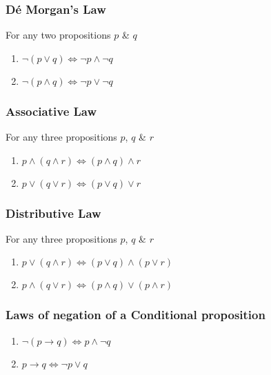 \documentclass{article}
\begin{document}
	\subsubsection{D\'{e} Morgan's Law}
	For any two propositions $p$ \& $q$
	\begin{enumerate}[label=\roman*)]
		\item $\neg(p\lor q)\Leftrightarrow\neg p\land\neg q$
		\item $\neg(p\land q)\Leftrightarrow\neg p\lor\neg q$
	\end{enumerate}

	\subsubsection{Associative Law}
	For any three propositions $p$, $q$ \& $r$
	\begin{enumerate}[label=\roman*)]
		\item $p\land(q\land r)\Leftrightarrow (p\land q)\land r$
		\item $p\lor(q\lor r)\Leftrightarrow (p\lor q)\lor r$
	\end{enumerate}

	\subsubsection{Distributive Law}
	For any three propositions $p$, $q$ \& $r$
	\begin{enumerate}[label=\roman*)]
		\item $p\lor(q\land r)\Leftrightarrow (p\lor q)\land(p\lor r)$
		\item $p\land(q\lor r)\Leftrightarrow (p\land q)\lor(p\land r)$
	\end{enumerate}

	\subsubsection{Laws of negation of a Conditional proposition}
	\begin{enumerate}[label=\roman*)]
		\item $\neg(p\to q)\Leftrightarrow p\land\neg q$
		\item $p\to q\Leftrightarrow \neg p\lor q$
	\end{enumerate}
\end{document}

